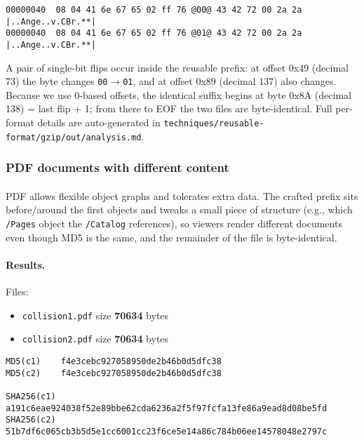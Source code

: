 \documentclass[runningheads]{llncs}
\begin{document}
    \begin{lstlisting}[style=hexhi, caption={GZIP prefix excerpt (visible flip)}, label={lst:gziphex}]
00000040  08 04 41 6e 67 65 02 ff 76 @00@ 43 42 72 00 2a 2a  |..Ange..v.CBr.**|
00000040  08 04 41 6e 67 65 02 ff 76 @01@ 43 42 72 00 2a 2a  |..Ange..v.CBr.**|
    \end{lstlisting}

    \textit{} A pair of single-bit flips occur inside the reusable prefix: at offset 0x49 (decimal 73) the byte changes \texttt{00$\rightarrow$01}, and at offset 0x89 (decimal 137) also changes. Because we use 0-based offsets, the identical suffix begins at byte 0x8A (decimal 138) = last flip + 1; from there to EOF the two files are byte-identical. Full per-format details are auto-generated in \texttt{techniques/reusable-format/gzip/out/analysis.md}.

    \subsubsection{PDF documents with different content}

    \paragraph{}
    PDF allows flexible object graphs and tolerates extra data. The crafted prefix sits before/around the first objects and tweaks a small piece of structure (e.g., which \texttt{/Pages} object the \texttt{/Catalog} references), so viewers render different documents even though MD5 is the same, and the remainder of the file is byte-identical.

    \paragraph{Results.}
    Files:
    \begin{itemize}
        \item \texttt{collision1.pdf} size \textbf{70634} bytes
        \item \texttt{collision2.pdf} size \textbf{70634} bytes
    \end{itemize}

    \begin{lstlisting}[style=textblock, caption={Hashes for the reusable PDF pair}, label={lst:pdfhashes}]
MD5(c1)    f4e3cebc927058950de2b46b0d5dfc38
MD5(c2)    f4e3cebc927058950de2b46b0d5dfc38

SHA256(c1) a191c6eae924038f52e89bbe62cda6236a2f5f97fcfa13fe86a9ead8d08be5fd
SHA256(c2) 51b7df6c065cb3b5d5e1cc6001cc23f6ce5e14a86c784b06ee14578048e2797c
    \end{lstlisting}
\end{document}

